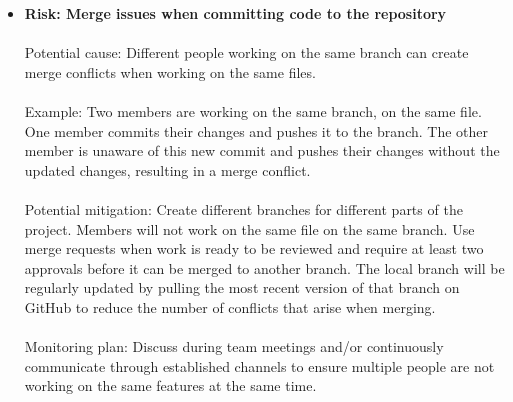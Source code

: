 \begin{itemize}
\item\textbf{Risk: Merge issues when committing code to the repository}
\\
\\ Potential cause: Different people working on the same branch can create merge conflicts when working on the same files.
\\
\\ Example: Two members are working on the same branch, on the same file. One member commits their changes and pushes it to the branch. The other member is unaware of this new commit and pushes their changes without the updated changes, resulting in a merge conflict.
\\
\\ Potential mitigation: Create different branches for different parts of the project. Members will not work on the same file on the same branch. Use merge requests when work is ready to be reviewed and require at least two approvals before it can be merged to another branch. The local branch will be regularly updated by pulling the most recent version of that branch on GitHub to reduce the number of conflicts that arise when merging.
\\
\\ Monitoring plan: Discuss during team meetings and/or continuously communicate through established channels to ensure multiple people are not working on the same features at the same time.
\\
\\


\end{itemize}

